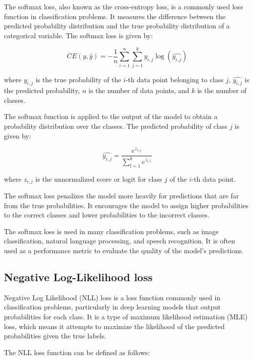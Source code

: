 The softmax loss, also known as the cross-entropy loss, is a commonly used loss function in classification problems. It measures the difference between the predicted probability distribution and the true probability distribution of a categorical variable. The softmax loss is given by:

\begin{equation}
	CE(y, \hat{y}) = -\frac{1}{n}\sum_{i=1}^{n}\sum_{j=1}^{k} y_{i,j}\log(\hat{y_{i,j}})
\end{equation}

where $y_{i,j}$ is the true probability of the $i$-th data point belonging to class $j$, $\hat{y_{i,j}}$ is the predicted probability, $n$ is the number of data points, and $k$ is the number of classes.

The softmax function is applied to the output of the model to obtain a probability distribution over the classes. The predicted probability of class $j$ is given by:

\begin{equation}
	\hat{y_{i,j}} = \frac{e^{z_{i,j}}}{\sum_{l=1}^{k} e^{z_{i,l}}}
\end{equation}

where $z_{i,j}$ is the unnormalized score or logit for class $j$ of the $i$-th data point.

The softmax loss penalizes the model more heavily for predictions that are far from the true probabilities. It encourages the model to assign higher probabilities to the correct classes and lower probabilities to the incorrect classes.

The softmax loss is used in many classification problems, such as image classification, natural language processing, and speech recognition. It is often used as a performance metric to evaluate the quality of the model's predictions.

\subsection{Negative Log-Likelihood loss}
\label{subsec:3_NLL_loss}

Negative Log Likelihood (NLL) loss is a loss function commonly used in classification problems, particularly in deep learning models that output probabilities for each class. It is a type of maximum likelihood estimation (MLE) loss, which means it attempts to maximize the likelihood of the predicted probabilities given the true labels.

The NLL loss function can be defined as follows:

